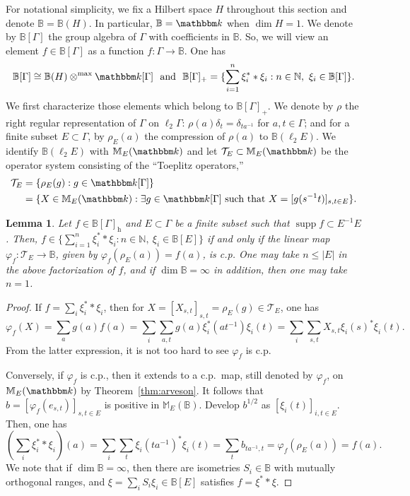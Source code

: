 \documentclass[12pt]{amsart}
\newtheorem{lem}[thm]{Lemma}
\theoremstyle{definition}
\begin{document}
For notational simplicity, we fix a Hilbert space ${H}$ throughout this section and
denote ${{\mathbb B}}={{\mathbb B}}({H})$. In particular, ${{\mathbb B}}={{\mathbbm k}}$ when $\dim {H}=1$.
We denote by ${{\mathbb B}}[{\Gamma}]$ the group algebra of ${\Gamma}$ with coefficients in ${{\mathbb B}}$.
So, we will view an element $f\in{{\mathbb B}}[{\Gamma}]$ as a function $f\colon{\Gamma}\to{{\mathbb B}}$.
One has
\[
{{\mathbb B}}[{\Gamma}]\cong{{\mathbb B}}({H})\otimes^{\max}{{\mathbbm k}}[{\Gamma}]
\ \mbox{ and }\
{{\mathbb B}}[{\Gamma}]_+=\{ \sum_{i=1}^n\xi_i^**\xi_i : n\in{{\mathbb N}},\ \xi_i\in{{\mathbb B}}[{\Gamma}]\}.
\]
We first characterize those elements which belong to ${{\mathbb B}}[{\Gamma}]_+$.
We denote by $\rho$ the right regular representation of ${\Gamma}$ on $\ell_2{\Gamma}$:
$\rho(a)\delta_t=\delta_{ta^{-1}}$ for $a,t\in{\Gamma}$; and
for a finite subset $E\subset{\Gamma}$,
by $\rho_E(a)$ the compression of $\rho(a)$ to ${{\mathbb B}}(\ell_2 E)$.
We identify ${{\mathbb B}}(\ell_2 E)$ with ${{\mathbb M}}_E({{\mathbbm k}})$ and
let ${{\mathcal T}}_E\subset{{\mathbb M}}_E({{\mathbbm k}})$ be the operator system consisting
of the ``Toeplitz operators,''
\begin{align*}
{{\mathcal T}}_E
 &=\{ \rho_E(g) : g\in{{\mathbbm k}}[{\Gamma}]\}\\
 &=\{ X\in{{\mathbb M}}_E({{\mathbbm k}}) : \exists g\in{{\mathbbm k}}[{\Gamma}] \mbox{ such that }X=[g(s^{-1}t)]_{s,t\in E} \}.
\end{align*}
\begin{lem}\label{lem:hscondition}
Let $f\in {{\mathbb B}}[{\Gamma}]_{\mathrm{h}}$ and $E\subset{\Gamma}$ be a finite subset such that $\operatorname*{supp} f\subset E^{-1}E$.
Then, $f\in\{ \sum_{i=1}^n \xi_i^**\xi_i : n\in{{\mathbb N}},\ \xi_i\in {{\mathbb B}}[E]\}$ if and only if
the linear map ${\varphi}_f\colon{{\mathcal T}}_E\to {{\mathbb B}}$, given by ${\varphi}_f(\rho_E(a))=f(a)$, is c.p.
One may take $n\le|E|$ in the above factorization of $f$,
and if $\dim{{\mathbb B}}=\infty$ in addition, then one may take $n=1$.
\end{lem}
\begin{proof}
If $f=\sum_i \xi_i^**\xi_i$, then for $X=[X_{s,t}]_{s,t}=\rho_E(g)\in{{\mathcal T}}_E$, one has
\[
{\varphi}_f(X)=\sum_a g(a)f(a)= \sum_i\sum_{a,t} g(a)\xi_i^*(at^{-1})\xi_i(t)
=\sum_i\sum_{s,t} X_{s,t}\xi_i(s)^*\xi_i(t).
\]
 From the latter expression, it is not too hard to see ${\varphi}_f$ is c.p.

Conversely, if ${\varphi}_f$ is c.p., then it extends to a c.p.\ map,
still denoted by ${\varphi}_f$, on ${{\mathbb M}}_E({{\mathbbm k}})$ by Theorem~\ref{thm:arveson}.
It follows that $b=[{\varphi}_f(e_{s,t})]_{s,t\in E}$ is positive in ${{\mathbb M}}_E({{\mathbb B}})$.
Develop $b^{1/2}$ as $[\xi_i(t)]_{i,t\in E}$. Then, one has
\[
(\sum_i \xi_i^**\xi_i)(a)
=\sum_i\sum_t \xi_i(ta^{-1})^*\xi_i(t)
=\sum_t b_{ta^{-1},t}
={\varphi}_f(\rho_E(a))=f(a).
\]
We note that if $\dim{{\mathbb B}}=\infty$, then there are isometries $S_i\in{{\mathbb B}}$
with mutually orthogonal ranges, and $\xi=\sum_i S_i\xi_i\in{{\mathbb B}}[E]$
satisfies $f=\xi^**\xi$.
\end{proof}
\end{document}
